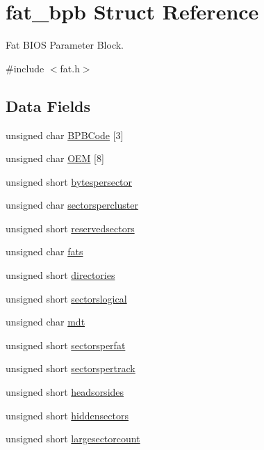 \hypertarget{a00053}{}\section{fat\+\_\+bpb Struct Reference}
\label{a00053}


Fat B\+I\+OS Parameter Block.  




{\ttfamily \#include $<$fat.\+h$>$}

\subsection*{Data Fields}
\begin{DoxyCompactItemize}
\item 
unsigned char \hyperlink{a00053_a692e2fbe0857aa497a3bcf8ef2f14a5d_a692e2fbe0857aa497a3bcf8ef2f14a5d}{B\+P\+B\+Code} \mbox{[}3\mbox{]}
\item 
unsigned char \hyperlink{a00053_a1ea9743362295df1f3354a68fb30db97_a1ea9743362295df1f3354a68fb30db97}{O\+EM} \mbox{[}8\mbox{]}
\item 
unsigned short \hyperlink{a00053_a99b879ef2b4ebb9d64c3cd29a098cef8_a99b879ef2b4ebb9d64c3cd29a098cef8}{bytespersector}
\item 
unsigned char \hyperlink{a00053_a7d24a3d215b2b5dadf3b49d8efe669fa_a7d24a3d215b2b5dadf3b49d8efe669fa}{sectorspercluster}
\item 
unsigned short \hyperlink{a00053_ab9240f9a3403f33a95ccf401d5352262_ab9240f9a3403f33a95ccf401d5352262}{reservedsectors}
\item 
unsigned char \hyperlink{a00053_a5c0fe7a49a7ebb19df4fad6978b09ead_a5c0fe7a49a7ebb19df4fad6978b09ead}{fats}
\item 
unsigned short \hyperlink{a00053_a9d593b3eed8b2aad45be25375b167b39_a9d593b3eed8b2aad45be25375b167b39}{directories}
\item 
unsigned short \hyperlink{a00053_a12a8f2901c0f6428083170c0c50f3f7a_a12a8f2901c0f6428083170c0c50f3f7a}{sectorslogical}
\item 
unsigned char \hyperlink{a00053_a238908353debb66f7bf5e1da634a394b_a238908353debb66f7bf5e1da634a394b}{mdt}
\item 
unsigned short \hyperlink{a00053_a4ed1d127c7be8fac9744a64b1f3934a4_a4ed1d127c7be8fac9744a64b1f3934a4}{sectorsperfat}
\item 
unsigned short \hyperlink{a00053_aa099f2bcf792b7a36f280173637741dc_aa099f2bcf792b7a36f280173637741dc}{sectorspertrack}
\item 
unsigned short \hyperlink{a00053_a5a2f522bdb24c8feac1d5d4de06eced1_a5a2f522bdb24c8feac1d5d4de06eced1}{headsorsides}
\item 
unsigned short \hyperlink{a00053_ae9cc695264914815727335037bb53b32_ae9cc695264914815727335037bb53b32}{hiddensectors}
\item 
unsigned short \hyperlink{a00053_ad5e6c760595c91f1838f166521e7b095_ad5e6c760595c91f1838f166521e7b095}{largesectorcount}
\end{DoxyCompactItemize}


